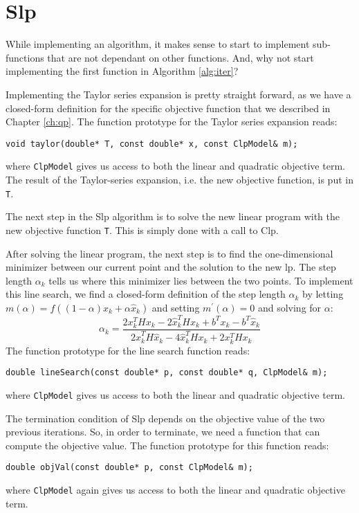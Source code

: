 \section{Slp}
While implementing an algorithm, it makes sense to start to implement
sub-functions that are not dependant on other functions. And, why not
start implementing the first function in Algorithm \ref{alg:iter}?

Implementing the Taylor series expansion is pretty straight forward, as
we have a closed-form definition for the specific objective function that
we described in Chapter \ref{ch:qp}. The function prototype for the
Taylor series expansion reads:
\begin{verbatim}
void taylor(double* T, const double* x, const ClpModel& m);
\end{verbatim}
where \texttt{ClpModel} gives us access to both the linear and quadratic
objective term. The result of the Taylor-series expansion, i.e. the new
objective function, is put in \texttt{T}.

The next step in the Slp algorithm is to solve the new linear program with the
new objective function \texttt{T}. This is simply done with a call to Clp.

After solving the linear program, the next step is to find the one-dimensional
minimizer between our current point and the solution to the new lp.
The step length $\alpha_k$ tells us where this minimizer lies between the two
points.
To implement this line search, we find a closed-form definition of the step
length $\alpha_k$ by letting $m(\alpha) = f((1-\alpha) x_k + \alpha \hat{x}_k)$
and setting $m^\prime(\alpha) = 0$ and solving for $\alpha$:
\[
\alpha_k = \frac{
                2x_k^T H x_k
                - 2\hat{x}_k^T H x_k
                + b^T x_k - b^T \hat{x}_k
                }{
                  2\hat{x}_k^T H \hat{x}_k
                - 4\hat{x}_k^T H x_k
                + 2x_k^T H x_k
                }
\]
The function prototype for the line search function reads:
\begin{verbatim}
double lineSearch(const double* p, const double* q, ClpModel& m);
\end{verbatim}
where \texttt{ClpModel} gives us access to both the linear and quadratic
objective term.

The termination condition of Slp depends on the objective value of the two
previous iterations. So, in order to terminate, we need a function that can
compute the objective value. The function prototype for this function reads:
\begin{verbatim}
double objVal(const double* p, const ClpModel& m);
\end{verbatim}
where \texttt{ClpModel} again gives us access to both the linear and quadratic
objective term.

